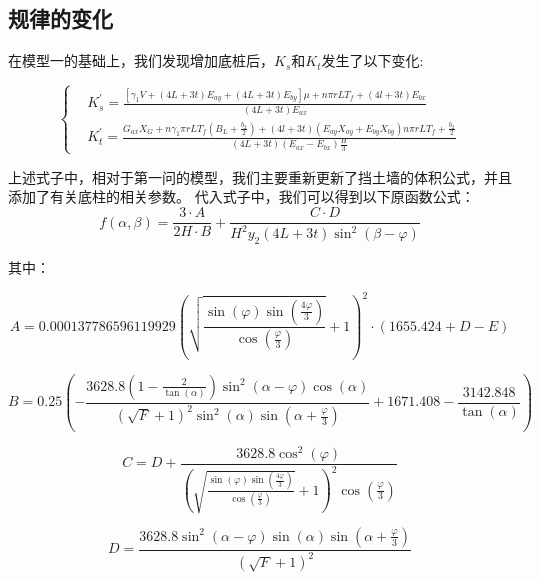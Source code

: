 \documentclass[withoutpreface,bwprint]{cumcmthesis}
\begin{document}
\subsection{规律的变化}
在模型一的基础上，我们发现增加底桩后，$K_s$和$K_t$发生了以下变化:

    \begin{equation}
        \left\{
            \begin{aligned}
                &K_s^{\prime}=\frac{[\gamma_1 V+(4L+3t)E_{ay}+(4L+3t)E_{by}]\mu +n\pi rLT_f+(4l+3t)E_{bx}}{(4L+3t)E_{ax}} \\
                &K_t^{\prime} = \frac{{G_{ax}}X_G+n\gamma_1\pi rLT_f(B_L+\frac{b_2}{2}) + (4l + 3t)(E_{ay}X_{ay} + E_{by}X_{by})n\pi rLT_f+\frac{b_2}{2}}{(4L+3t)(E_{ax}-E_{bx})\frac{H}{3}}
            \end{aligned}
        \right.
    \end{equation}
    \par
上述式子中，相对于第一问的模型，我们主要重新更新了挡土墙的体积公式，并且添加了有关底柱的相关参数。
代入式子中，我们可以得到以下原函数公式：
    \begin{equation}
        f(\alpha, \beta) = \frac{3 \cdot A}{2H \cdot B} + \frac{C \cdot D}{H^2 y_2 (4L + 3t) \sin^2(\beta - \varphi)}
    \end{equation}\par
其中：

\begin{equation*}
    A = 0.000137786596119929 \left( \sqrt{\frac{\sin(\varphi) \sin\left(\frac{4\varphi}{3}\right)}{\cos\left(\frac{\varphi}{3}\right)}} + 1 \right)^2 \cdot \left( 1655.424 + D - E \right)
\end{equation*}

\begin{equation*}
    B = 0.25 \left( -\frac{3628.8 \left(1 - \frac{2}{\tan(\alpha)}\right) \sin^2(\alpha-\varphi) \cos(\alpha)}{(\sqrt{F} + 1)^2 \sin^2(\alpha) \sin\left(\alpha+\frac{\varphi}{3}\right)} + 1671.408 - \frac{3142.848}{\tan(\alpha)} \right)
\end{equation*}

\begin{equation*}
    C = D + \frac{3628.8 \cos^2(\varphi)}{\left( \sqrt{\frac{\sin(\varphi) \sin\left(\frac{4\varphi}{3}\right)}{\cos\left(\frac{\varphi}{3}\right)}} + 1 \right)^2 \cos\left(\frac{\varphi}{3}\right)}
\end{equation*}

\begin{equation*}
    D = \frac{3628.8 \sin^2(\alpha-\varphi) \sin(\alpha) \sin\left(\alpha+\frac{\varphi}{3}\right)}{(\sqrt{F} + 1)^2}
\end{equation*}
\end{document}
